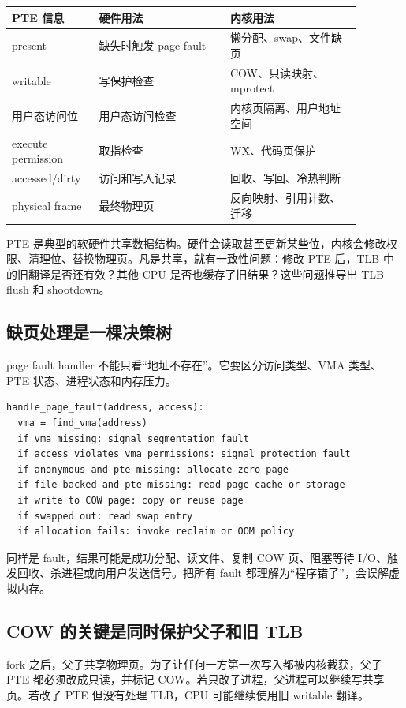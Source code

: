 \begin{longtable}{p{0.2\linewidth}p{0.34\linewidth}p{0.34\linewidth}}
\toprule
PTE 信息 & 硬件用法 & 内核用法 \\
\midrule
present & 缺失时触发 page fault & 懒分配、swap、文件缺页 \\
writable & 写保护检查 & COW、只读映射、mprotect \\
用户态访问位 & 用户态访问检查 & 内核页隔离、用户地址空间 \\
execute permission & 取指检查 & W\^X、代码页保护 \\
accessed/dirty & 访问和写入记录 & 回收、写回、冷热判断 \\
physical frame & 最终物理页 & 反向映射、引用计数、迁移 \\
\bottomrule
\end{longtable}

PTE 是典型的软硬件共享数据结构。硬件会读取甚至更新某些位，内核会修改权限、清理位、替换物理页。凡是共享，就有一致性问题：修改 PTE 后，TLB 中的旧翻译是否还有效？其他 CPU 是否也缓存了旧结果？这些问题推导出 TLB flush 和 shootdown。

\subsection{缺页处理是一棵决策树}

page fault handler 不能只看“地址不存在”。它要区分访问类型、VMA 类型、PTE 状态、进程状态和内存压力。

\begin{lstlisting}
handle_page_fault(address, access):
  vma = find_vma(address)
  if vma missing: signal segmentation fault
  if access violates vma permissions: signal protection fault
  if anonymous and pte missing: allocate zero page
  if file-backed and pte missing: read page cache or storage
  if write to COW page: copy or reuse page
  if swapped out: read swap entry
  if allocation fails: invoke reclaim or OOM policy
\end{lstlisting}

同样是 fault，结果可能是成功分配、读文件、复制 COW 页、阻塞等待 I/O、触发回收、杀进程或向用户发送信号。把所有 fault 都理解为“程序错了”，会误解虚拟内存。

\subsection{COW 的关键是同时保护父子和旧 TLB}

fork 之后，父子共享物理页。为了让任何一方第一次写入都被内核截获，父子 PTE 都必须改成只读，并标记 COW。若只改子进程，父进程可以继续写共享页。若改了 PTE 但没有处理 TLB，CPU 可能继续使用旧 writable 翻译。

